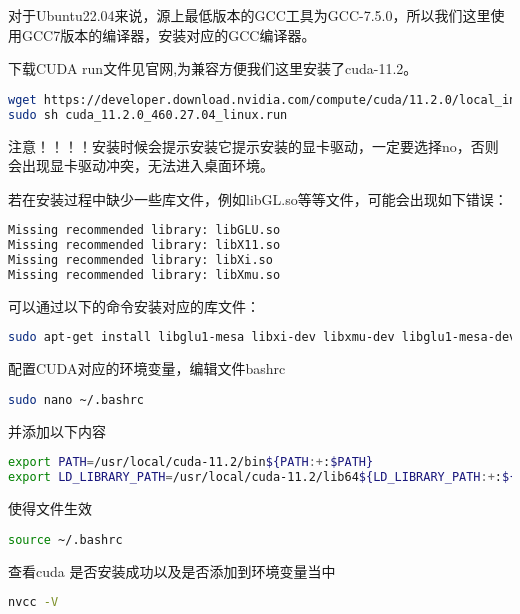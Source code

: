 \documentclass[lang=cn,a4paper,newtx]{elegantpaper}
\begin{document}
对于Ubuntu22.04来说，源上最低版本的GCC工具为GCC-7.5.0，所以我们这里使用GCC7版本的编译器，安装对应的GCC编译器。

下载CUDA run文件见官网,为兼容方便我们这里安装了cuda-11.2。
\begin{lstlisting}[language=bash]
wget https://developer.download.nvidia.com/compute/cuda/11.2.0/local_installers/cuda_11.2.0_460.27.04_linux.run
sudo sh cuda_11.2.0_460.27.04_linux.run
\end{lstlisting}

注意！！！！安装时候会提示安装它提示安装的显卡驱动，一定要选择no，否则会出现显卡驱动冲突，无法进入桌面环境。

若在安装过程中缺少一些库文件，例如libGL.so等等文件，可能会出现如下错误：
\begin{lstlisting}[language=bash]
Missing recommended library: libGLU.so
Missing recommended library: libX11.so
Missing recommended library: libXi.so
Missing recommended library: libXmu.so
\end{lstlisting}

可以通过以下的命令安装对应的库文件：
\begin{lstlisting}[language=bash]
sudo apt-get install libglu1-mesa libxi-dev libxmu-dev libglu1-mesa-dev
\end{lstlisting}
配置CUDA对应的环境变量，编辑文件bashrc
\begin{lstlisting}[language=bash]
sudo nano ~/.bashrc
\end{lstlisting}


并添加以下内容
\begin{lstlisting}[language=bash]
export PATH=/usr/local/cuda-11.2/bin${PATH:+:$PATH}
export LD_LIBRARY_PATH=/usr/local/cuda-11.2/lib64${LD_LIBRARY_PATH:+:${LD_LIBRARY_PATH}}
\end{lstlisting}


使得文件生效
\begin{lstlisting}[language=bash]
source ~/.bashrc
\end{lstlisting}

查看cuda 是否安装成功以及是否添加到环境变量当中
\begin{lstlisting}[language=bash]
nvcc -V
\end{lstlisting}
\end{document}
